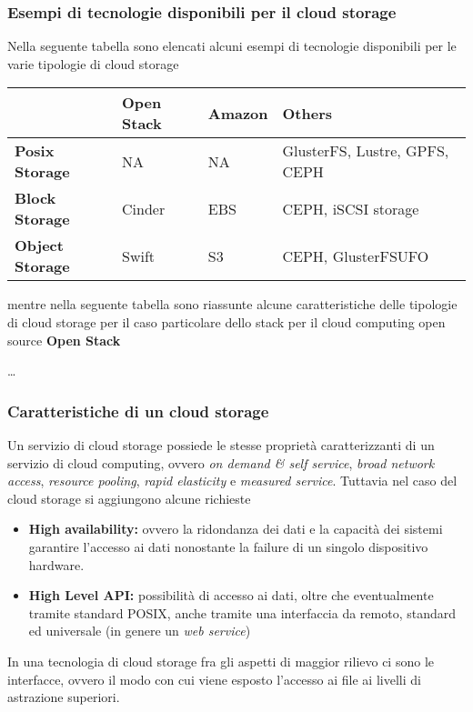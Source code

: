 \documentclass[italian,]{article}
\providecommand{\tightlist}{%
  \setlength{\itemsep}{0pt}\setlength{\parskip}{0pt}}
\begin{document}
\subsubsection{Esempi di tecnologie disponibili per il cloud
storage}\label{esempi-di-tecnologie-disponibili-per-il-cloud-storage}

Nella seguente tabella sono elencati alcuni esempi di tecnologie
disponibili per le varie tipologie di cloud storage

\begin{longtable}[]{@{}llll@{}}
\toprule
& \textbf{Open Stack} & \textbf{Amazon} & \textbf{Others}\tabularnewline
\midrule
\endhead
\textbf{Posix Storage} & NA & NA & GlusterFS, Lustre, GPFS,
CEPH\tabularnewline
\textbf{Block Storage} & Cinder & EBS & CEPH, iSCSI
storage\tabularnewline
\textbf{Object Storage} & Swift & S3 & CEPH, GlusterFSUFO\tabularnewline
\bottomrule
\end{longtable}

mentre nella seguente tabella sono riassunte alcune caratteristiche
delle tipologie di cloud storage per il caso particolare dello stack per
il cloud computing open source \textbf{Open Stack}

\ldots{}

\subsubsection{Caratteristiche di un cloud
storage}\label{caratteristiche-di-un-cloud-storage}

Un servizio di cloud storage possiede le stesse proprietà
caratterizzanti di un servizio di cloud computing, ovvero \emph{on
demand \& self service}, \emph{broad network access}, \emph{resource
pooling}, \emph{rapid elasticity} e \emph{measured service}. Tuttavia
nel caso del cloud storage si aggiungono alcune richieste

\begin{itemize}
\tightlist
\item
  \textbf{High availability:} ovvero la ridondanza dei dati e la
  capacità dei sistemi garantire l'accesso ai dati nonostante la failure
  di un singolo dispositivo hardware.
\item
  \textbf{High Level API:} possibilità di accesso ai dati, oltre che
  eventualmente tramite standard POSIX, anche tramite una interfaccia da
  remoto, standard ed universale (in genere un \emph{web service})
\end{itemize}

In una tecnologia di cloud storage fra gli aspetti di maggior rilievo ci
sono le interfacce, ovvero il modo con cui viene esposto l'accesso ai
file ai livelli di astrazione superiori.
\end{document}
